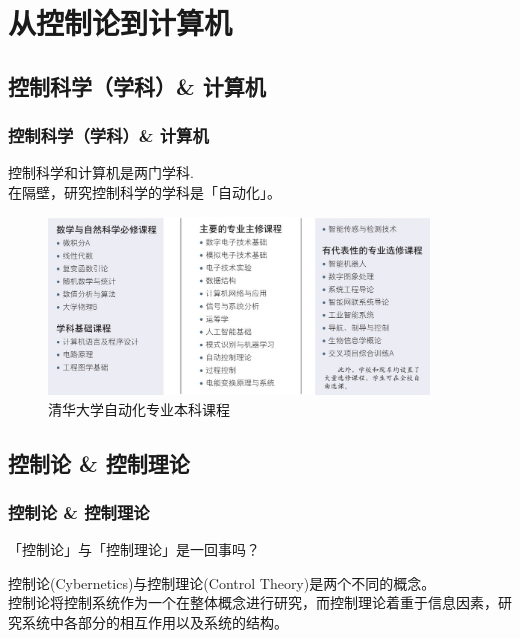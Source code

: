 \documentclass[12pt,AutoFakeBold,aspectratio=43,mathserif]{beamer}
\begin{document}
    \section{从控制论到计算机}
    \subsection{控制科学（学科）\& 计算机}
    \begin{frame}
        \frametitle{控制科学（学科）\& 计算机}
        \pause
        控制科学和计算机是两门学科. \\
        在隔壁，研究控制科学的学科是「自动化」。
        \begin{figure}[htbp]
            \caption{清华大学自动化专业本科课程}
            \setlength{\abovecaptionskip}{0.cm}
            \setlength{\belowcaptionskip}{-0.cm}
            \centering
            \vspace{-0.3cm}
            \setlength{\abovecaptionskip}{0.cm}
            \setlength{\belowcaptionskip}{-0.cm}
            \includegraphics[width=0.9\textwidth]{figures/3-1.jpg}
        \end{figure}
    \end{frame}
    \subsection{控制论 \& 控制理论}
    \begin{frame}
        \frametitle{控制论 \& 控制理论}
        \begin{block}{\textnormal{「控制论」与「控制理论」是一回事吗？}}
        \end{block} \pause
        控制论(Cybernetics)与控制理论(Control Theory)是两个不同的概念。 \\
        控制论将控制系统作为一个在整体概念进行研究，而控制理论着重于信息因素，研究系统中各部分的相互作用以及系统的结构。
        \pause
        
    
    \end{frame}
\end{document}
